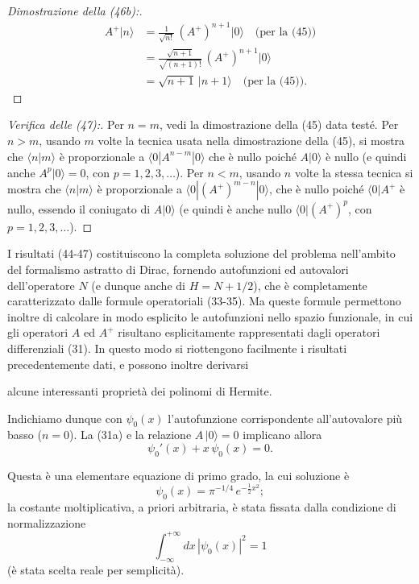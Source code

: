\documentclass[11pt, a4paper]{book}
\numberwithin{equation}{section}
\begin{document}
\begin{proof}[Dimostrazione della (46b):]
\begin{align*}
A^+|n\rangle
  &= \frac{1}{\sqrt{n!}}\,(A^+)^{n+1}|0\rangle
     \quad \text{(per la (45))} \\
  &= \frac{\sqrt{n+1}}{\sqrt{(n+1)!}}\,(A^+)^{n+1}|0\rangle \\
  &= \sqrt{n+1}\,|n+1\rangle
     \quad \text{(per la (45))}.
\end{align*}
\end{proof}

\begin{proof}[Verifica delle (47):]
Per $n = m$, vedi la dimostrazione della (45) data testé.
Per $n > m$, usando $m$ volte la tecnica usata nella dimostrazione della
(45), si mostra che $\langle n|m\rangle$ è proporzionale a
$\langle 0|A^{n-m}|0\rangle$ che è nullo poiché $A|0\rangle$ è nullo (e
quindi anche $A^p|0\rangle = 0$, con $p = 1,2,3,\ldots$). Per $n < m$,
usando $n$ volte la stessa tecnica si mostra che $\langle n|m\rangle$ è
proporzionale a $\langle 0|(A^+)^{m-n}|0\rangle$, che è nullo poiché
$\langle 0|A^+$ è nullo, essendo il coniugato di $A|0\rangle$ (e quindi è
anche nullo $\langle 0|(A^+)^p$, con $p = 1,2,3,\ldots$).
\end{proof}

I risultati (44-47) costituiscono la completa soluzione del problema
nell'ambito del formalismo astratto di Dirac, fornendo autofunzioni ed
autovalori dell'operatore $N$ (e dunque anche di $H = N + 1/2$), che è
completamente caratterizzato dalle formule operatoriali (33-35). Ma queste
formule permettono inoltre di calcolare in modo esplicito le autofunzioni
nello spazio funzionale, in cui gli operatori $A$ ed $A^+$ risultano
esplicitamente rappresentati dagli operatori differenziali (31). In questo
modo si riottengono facilmente i risultati precedentemente dati, e possono
inoltre derivarsi


alcune interessanti proprietà dei polinomi di Hermite.

Indichiamo dunque con $\psi_0(x)$ l'autofunzione corrispondente
all'autovalore più basso ($n = 0$). La (31a) e la relazione $A\,|0\rangle
= 0$ implicano allora
\begin{equation}
\psi_0'(x) + x\,\psi_0(x) = 0.
\end{equation}

Questa è una elementare equazione di primo grado, la cui soluzione è
\begin{equation}
\psi_0(x) = \pi^{-1/4}\,e^{-\frac{1}{2}x^2};
\end{equation}
la costante moltiplicativa, a priori arbitraria, è stata fissata dalla
condizione di normalizzazione
\begin{equation}
\int_{-\infty}^{+\infty} dx\,|\psi_0(x)|^2 = 1
\end{equation}
(è stata scelta reale per semplicità).
\end{document}
